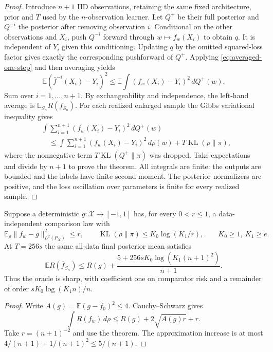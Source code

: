 \begin{proof}
Introduce $n+1$ IID observations, retaining the same fixed architecture,
prior and $T$ used by the $n$-observation learner. Let $Q^+$ be their full
posterior and $Q^{-i}$ the posterior after removing observation $i$.
Conditional on the other observations and $X_i$, push $Q^{-i}$ forward
through $w\mapsto f_w(X_i)$ to obtain $q$. It is independent of $Y_i$
given this conditioning. Updating $q$ by the omitted squared-loss factor
gives exactly the corresponding pushforward of $Q^+$.
Applying \eqref{eq:averaged-one-step} and then averaging yields
\[
 \mathbb E (\bar f^{-i}(X_i)-Y_i)^2
 \le\mathbb E\int(f_w(X_i)-Y_i)^2\,dQ^+(w).
\]
Sum over $i=1,\ldots,n+1$. By exchangeability and independence, the
left-hand average is $\mathbb E_{S_n}R(\bar f_{S_n})$.
For each realized enlarged sample the Gibbs variational inequality gives
\begin{align*}
 &\int\sum_{i=1}^{n+1}(f_w(X_i)-Y_i)^2\,dQ^+(w)\\
 &\quad\le\int\sum_{i=1}^{n+1}(f_w(X_i)-Y_i)^2\,d\rho(w)
             +T\operatorname{KL}(\rho\|\pi),
\end{align*}
where the nonnegative term $T\operatorname{KL}(Q^+\|\pi)$ was dropped.
Take expectations and divide by $n+1$ to prove the theorem.
All integrals are finite: the outputs are bounded and the labels have
finite second moment. The posterior normalizers are positive, and the
loss oscillation over parameters is finite for every realized sample.
\end{proof}

\begin{corollary}
Suppose a deterministic $g:\mathcal X\to[-1,1]$ has, for every $0<r\le1$,
a data-independent comparison law with
\[
 \mathbb E_\rho\|f_w-g\|_{L^2(P_X)}^2\le r,
 \qquad \operatorname{KL}(\rho\|\pi)\le K_0\log(K_1/r),
 \qquad K_0\ge1,\ K_1\ge e.
\]
At $T=256s$ the same all-data final posterior mean satisfies
\[
 \mathbb E R(\bar f_{S_n})
 \le R(g)+\frac{5+256sK_0\log(K_1(n+1)^2)}{n+1}.
\]
Thus the oracle is sharp, with coefficient one on comparator risk and
a remainder of order $sK_0\log(K_1n)/n$.
\end{corollary}
\begin{proof}
Write $A(g)=\mathbb E(g-f_0)^2\le4$. Cauchy--Schwarz gives
\[
 \int R(f_w)\,d\rho
 \le R(g)+2\sqrt{A(g)r}+r.
\]
Take $r=(n+1)^{-2}$ and use the theorem. The approximation increase is
at most $4/(n+1)+1/(n+1)^2\le5/(n+1)$.
\end{proof}

